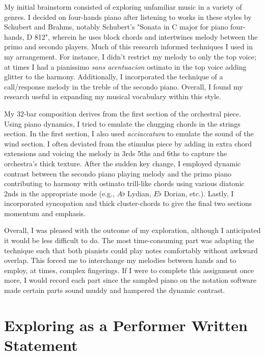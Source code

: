 \documentclass[12pt]{article}
\begin{document}
My initial brainstorm consisted of exploring unfamiliar music in a variety of genres. I decided on four-hands piano after listening to works in these styles by Schubert and Brahms, notably Schubert’s "Sonata in C major for piano four-hands, D 812", wherein he uses block chords and intertwines melody between the primo and secondo players. Much of this research informed techniques I used in my arrangement. For instance, I didn't restrict my melody to only the top voice; at times I had a pianissimo \textit{sans acentuacion} ostinato in the top voice adding glitter to the harmony. Additionally, I incorporated the technique of a call/response melody in the treble of the secondo piano. Overall, I found my research useful in expanding my musical vocabulary within this style.

My 32-bar composition derives from the first section of the orchestral piece. Using piano dynamics, I tried to emulate the chugging chords in the strings section. In the first section, I also used \textit{acciaccatura} to emulate the sound of the wind section. I often deviated from the stimulus piece by adding in extra chord extensions and voicing the melody in 3rds 5ths and 6ths to capture the orchestra's thick texture. After the sudden key change, I employed dynamic contrast between the secondo piano playing melody and the primo piano contributing to harmony with ostinato trill-like chords using various diatonic 2nds in the appropriate mode (e.g., $A\flat$ Lydian, $E\flat$ Dorian, etc.). Lastly, I incorporated syncopation and thick cluster-chords to give the final two sections momentum and emphasis.

Overall, I was pleased with the outcome of my exploration, although I anticipated it would be less difficult to do. The most time-consuming part was adapting the technique such that both pianists could play notes comfortably without awkward overlap. This forced me to interchange my melodies between hands and to employ, at times, complex fingerings. If I were to complete this assignment once more, I would record each part since the sampled piano on the notation software made certain parts sound muddy and hampered the dynamic contrast.


\section{Exploring as a Performer Written Statement}
\end{document}
